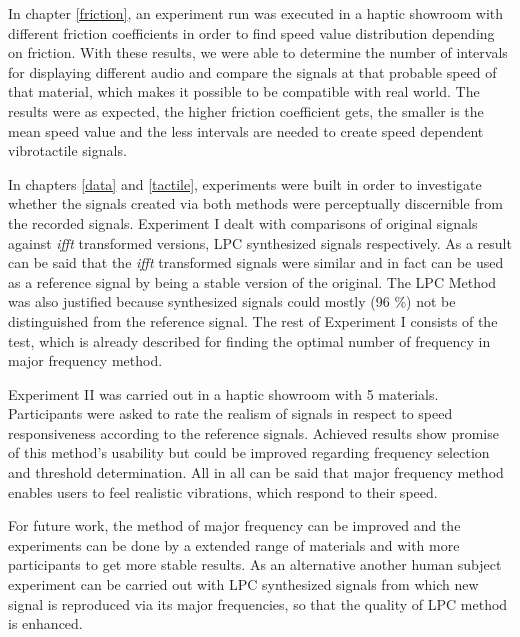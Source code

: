 In chapter \ref{friction}, an experiment run was executed in a haptic showroom with different friction coefficients in order to find speed value distribution depending on friction. With these results, we were able to determine the number of intervals for displaying different audio and compare the signals at that probable speed of that material, which makes it possible to be compatible with real world. The results were as expected, the higher friction coefficient gets, the smaller is the mean speed value and the less intervals are needed to create speed dependent vibrotactile signals.

In chapters \ref{data} and \ref{tactile}, experiments were built in order to investigate whether the signals created via both methods were perceptually discernible from the recorded signals. Experiment I dealt with comparisons of original signals against \emph{ifft} transformed versions, LPC synthesized signals respectively. As a result can be said that the \emph{ifft} transformed signals were similar and in fact can be used as a reference signal by being a stable version of the original. The LPC Method was also justified because synthesized signals could mostly (96 \%) not be distinguished from the reference signal. The rest of Experiment I consists of the test, which is already described for finding the optimal number of frequency in major frequency method. 

Experiment II was carried out in a haptic showroom with 5 materials. Participants were asked to rate the realism of signals in respect to speed responsiveness according to the reference signals. Achieved results show promise of this method's usability but could be improved regarding frequency selection and threshold determination. All in all can be said that major frequency method enables users to feel realistic vibrations, which respond to their speed.

For future work, the method of major frequency can be improved and the experiments can be done by a extended range of materials and with more participants to get more stable results. As an alternative another human subject experiment can be carried out with LPC synthesized signals from which new signal is reproduced via its major frequencies, so that the quality of LPC method is enhanced.  







